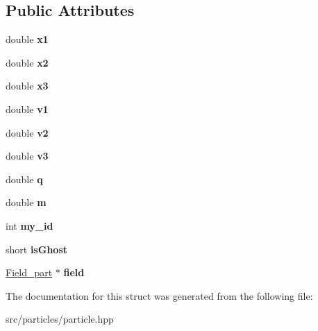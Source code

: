 \subsection*{Public Attributes}
\begin{DoxyCompactItemize}
\item 
\hypertarget{struct_particle_ad565762c5789038a38b77b8b7b73108e}{}\label{struct_particle_ad565762c5789038a38b77b8b7b73108e} 
double {\bfseries x1}
\item 
\hypertarget{struct_particle_a4c6d32080244942982cddb6c6908ee5d}{}\label{struct_particle_a4c6d32080244942982cddb6c6908ee5d} 
double {\bfseries x2}
\item 
\hypertarget{struct_particle_a252ebc476e3bdf3deb799de97b55c136}{}\label{struct_particle_a252ebc476e3bdf3deb799de97b55c136} 
double {\bfseries x3}
\item 
\hypertarget{struct_particle_a50d359033a629a9004251ae121f104a3}{}\label{struct_particle_a50d359033a629a9004251ae121f104a3} 
double {\bfseries v1}
\item 
\hypertarget{struct_particle_afbd6500ae530cee3449acea407196faa}{}\label{struct_particle_afbd6500ae530cee3449acea407196faa} 
double {\bfseries v2}
\item 
\hypertarget{struct_particle_a70a3e519b0d00c7a34c7bcd8ad3f0934}{}\label{struct_particle_a70a3e519b0d00c7a34c7bcd8ad3f0934} 
double {\bfseries v3}
\item 
\hypertarget{struct_particle_a566dcc1de4bdc01251776948798ea8e1}{}\label{struct_particle_a566dcc1de4bdc01251776948798ea8e1} 
double {\bfseries q}
\item 
\hypertarget{struct_particle_aedcc7e1bc53b0e2b1a4a07c9a1b47563}{}\label{struct_particle_aedcc7e1bc53b0e2b1a4a07c9a1b47563} 
double {\bfseries m}
\item 
\hypertarget{struct_particle_a8c5aa296be47df7d6bbfe3a3f602f3d5}{}\label{struct_particle_a8c5aa296be47df7d6bbfe3a3f602f3d5} 
int {\bfseries my\+\_\+id}
\item 
\hypertarget{struct_particle_a2e15a24415109ae666abf197c6c0e7f8}{}\label{struct_particle_a2e15a24415109ae666abf197c6c0e7f8} 
short {\bfseries is\+Ghost}
\item 
\hypertarget{struct_particle_af67f3dec8a08a0c79a6b206602289d45}{}\label{struct_particle_af67f3dec8a08a0c79a6b206602289d45} 
\hyperlink{struct_field__part}{Field\+\_\+part} $\ast$ {\bfseries field}
\end{DoxyCompactItemize}


The documentation for this struct was generated from the following file\+:\begin{DoxyCompactItemize}
\item 
src/particles/particle.\+hpp\end{DoxyCompactItemize}
